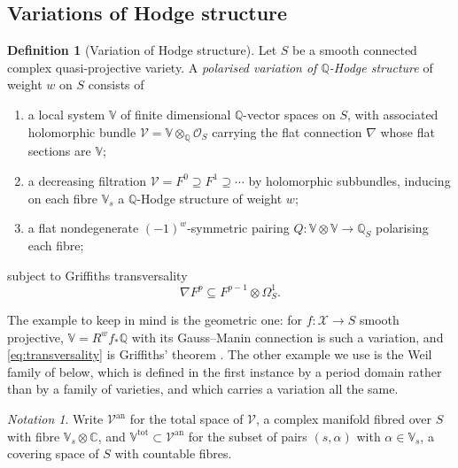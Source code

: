 \documentclass[11pt,reqno]{amsart}
\theoremstyle{plain}
\theoremstyle{definition}
\newtheorem{definition}[theorem]{Definition}
\theoremstyle{remark}
\newtheorem{notation}[theorem]{Notation}
\newcommand{\QQ}{\mathbb{Q}}
\newcommand{\CC}{\mathbb{C}}
\newcommand{\cO}{\mathcal{O}}
\newcommand{\cV}{\mathcal{V}}
\newcommand{\cX}{\mathcal{X}}
\begin{document}
\subsection{Variations of Hodge structure}

\begin{definition}[Variation of Hodge structure]\label{def:vhs}
Let $S$ be a smooth connected complex quasi-projective variety. A
\emph{polarised variation of $\QQ$-Hodge structure} of weight $w$ on $S$
consists of
\begin{enumerate}[label=\textup{(\alph*)},nosep]
\item a local system $\mathbb{V}$ of finite dimensional $\QQ$-vector spaces on
  $S$, with associated holomorphic bundle
  $\cV=\mathbb{V}\otimes_{\QQ}\cO_{S}$ carrying the flat connection $\nabla$
  whose flat sections are $\mathbb{V}$;
\item a decreasing filtration $\cV=F^{0}\supseteq F^{1}\supseteq\cdots$ by
  holomorphic subbundles, inducing on each fibre $\mathbb{V}_{s}$ a
  $\QQ$-Hodge structure of weight $w$;
\item a flat nondegenerate $(-1)^{w}$-symmetric pairing
  $Q\colon\mathbb{V}\otimes\mathbb{V}\to\QQ_{S}$ polarising each fibre;
\end{enumerate}
subject to Griffiths transversality
\begin{equation}\label{eq:transversality}
  \nabla F^{p}\subseteq F^{p-1}\otimes\Omega^{1}_{S}.
\end{equation}
\end{definition}

The example to keep in mind is the geometric one: for $f\colon\cX\to S$ smooth
projective, $\mathbb{V}=R^{w}f_{*}\QQ$ with its Gauss--Manin connection is such
a variation, and \eqref{eq:transversality} is Griffiths' theorem
\cite[Ch.~10]{Voi02}. The other example we use is the Weil family of
 below, which is defined in the first instance by a
period domain rather than by a family of varieties, and which carries a
variation all the same.

\begin{notation}\label{not:totalspace}
Write $\cV^{\mathrm{an}}$ for the total space of $\cV$, a complex manifold
fibred over $S$ with fibre $\mathbb{V}_{s}\otimes\CC$, and
$\mathbb{V}^{\mathrm{tot}}\subset\cV^{\mathrm{an}}$ for the subset of pairs
$(s,\alpha)$ with $\alpha\in\mathbb{V}_{s}$, a covering space of $S$ with
countable fibres.
\end{notation}
\end{document}
